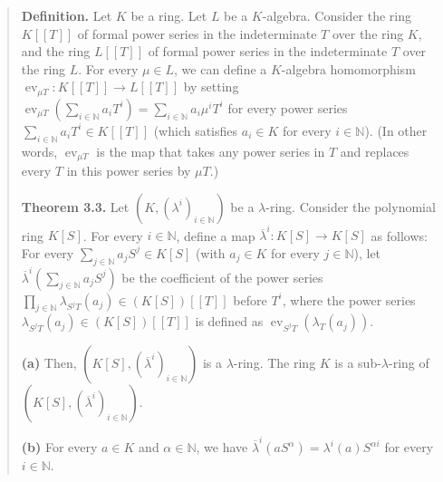 \documentclass[numbers=enddot,12pt,final,onecolumn,notitlepage]{scrartcl}%
\begin{document}
\begin{quote}
\textbf{Definition.} Let $K$ be a ring. Let $L$ be a $K$-algebra. Consider the
ring $K\left[  \left[  T\right]  \right]  $ of formal power series in the
indeterminate $T$ over the ring $K$, and the ring $L\left[  \left[  T\right]
\right]  $ of formal power series in the indeterminate $T$ over the ring $L$.
For every $\mu\in L$, we can define a $K$-algebra homomorphism
$\operatorname*{ev}_{\mu T}:K\left[  \left[  T\right]  \right]  \rightarrow
L\left[  \left[  T\right]  \right]  $ by setting $\operatorname*{ev}_{\mu
T}\left(  \sum\limits_{i\in\mathbb{N}}a_{i}T^{i}\right)  =\sum\limits_{i\in
\mathbb{N}}a_{i}\mu^{i}T^{i}$ for every power series $\sum\limits_{i\in
\mathbb{N}}a_{i}T^{i}\in K\left[  \left[  T\right]  \right]  $ (which
satisfies $a_{i}\in K$ for every $i\in\mathbb{N}$). (In other words,
$\operatorname*{ev}_{\mu T}$ is the map that takes any power series in $T$ and
replaces every $T$ in this power series by $\mu T$.)

\textbf{Theorem 3.3.} Let $\left(  K,\left(  \lambda^{i}\right)
_{i\in\mathbb{N}}\right)  $ be a $\lambda$-ring. Consider the polynomial ring
$K\left[  S\right]  $. For every $i\in\mathbb{N}$, define a map $\overline
{\lambda}^{i}:K\left[  S\right]  \rightarrow K\left[  S\right]  $ as follows:
For every $\sum\limits_{j\in\mathbb{N}}a_{j}S^{j}\in K\left[  S\right]  $
(with $a_{j}\in K$ for every $j\in\mathbb{N}$), let $\overline{\lambda}%
^{i}\left(  \sum\limits_{j\in\mathbb{N}}a_{j}S^{j}\right)  $ be the
coefficient of the power series $\prod\limits_{j\in\mathbb{N}}\lambda_{S^{j}%
T}\left(  a_{j}\right)  \in\left(  K\left[  S\right]  \right)  \left[  \left[
T\right]  \right]  $ before $T^{i}$, where the power series $\lambda_{S^{j}%
T}\left(  a_{j}\right)  \in\left(  K\left[  S\right]  \right)  \left[  \left[
T\right]  \right]  $ is defined as $\operatorname*{ev}_{S^{j}T}\left(
\lambda_{T}\left(  a_{j}\right)  \right)  $.

\textbf{(a)} Then, $\left(  K\left[  S\right]  ,\left(  \overline{\lambda}%
^{i}\right)  _{i\in\mathbb{N}}\right)  $ is a $\lambda$-ring. The ring $K$ is
a sub-$\lambda$-ring of $\left(  K\left[  S\right]  ,\left(  \overline
{\lambda}^{i}\right)  _{i\in\mathbb{N}}\right)  $.

\textbf{(b)} For every $a\in K$ and $\alpha\in\mathbb{N}$, we have
$\overline{\lambda}^{i}\left(  aS^{\alpha}\right)  =\lambda^{i}\left(
a\right)  S^{\alpha i}$ for every $i\in\mathbb{N}$.
\end{quote}
\end{document}
